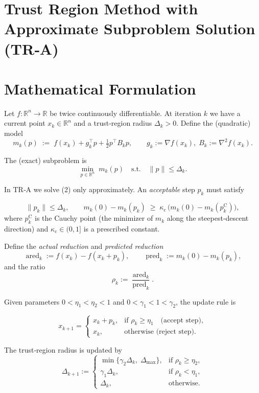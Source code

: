\documentclass[11pt]{article}
\begin{document}
\section*{Trust Region Method with Approximate Subproblem Solution (TR‑A)}

\section*{Mathematical Formulation}
Let $f:\mathbb{R}^{n}\rightarrow\mathbb{R}$ be twice continuously differentiable.  
At iteration $k$ we have a current point $x_{k}\in\mathbb{R}^{n}$ and a trust‑region radius $\Delta_{k}>0$.  
Define the (quadratic) model
\[
m_{k}(p)\;:=\;f(x_{k})+g_{k}^{\top}p+\tfrac12 p^{\top}B_{k}p,
\qquad 
g_{k}:=\nabla f(x_{k}),\; B_{k}:=\nabla^{2}f(x_{k}).
\tag{1}
\]

The (exact) subproblem is
\[
\min_{p\in\mathbb{R}^{n}}\; m_{k}(p)\quad\text{s.t.}\quad \|p\|\le \Delta_{k}.
\tag{2}
\]

In TR‑A we solve (2) only approximately.  An \emph{acceptable} step $p_{k}$ must satisfy

\[
\|p_{k}\|\le\Delta_{k},
\qquad
m_{k}(0)-m_{k}(p_{k})\;\ge\; \kappa_{\mathrm{c}}\,\bigl(m_{k}(0)-m_{k}(p^{\mathrm{C}}_{k})\bigr),
\tag{3}
\]
where $p^{\mathrm{C}}_{k}$ is the Cauchy point (the minimizer of $m_{k}$ along the steepest‑descent direction) and
$\kappa_{\mathrm{c}}\in(0,1]$ is a prescribed constant.

Define the \emph{actual reduction} and \emph{predicted reduction}
\[
\operatorname{ared}_{k}
:=f(x_{k})-f(x_{k}+p_{k}),\qquad
\operatorname{pred}_{k}
:=m_{k}(0)-m_{k}(p_{k}),
\tag{4}
\]
and the ratio
\[
\rho_{k}:=\frac{\operatorname{ared}_{k}}{\operatorname{pred}_{k}}.
\tag{5}
\]

Given parameters $0<\eta_{1}<\eta_{2}<1$ and $0<\gamma_{1}<1<\gamma_{2}$, the update rule is

\[
x_{k+1}=
\begin{cases}
x_{k}+p_{k}, & \text{if }\rho_{k}\ge \eta_{1}\quad\text{(accept step)},\\[4pt]
x_{k},       & \text{otherwise (reject step)}.
\end{cases}
\tag{6}
\]

The trust‑region radius is updated by
\[
\Delta_{k+1}:=
\begin{cases}
\min\{\gamma_{2}\Delta_{k},\;\Delta_{\max}\}, & \text{if }\rho_{k}\ge \eta_{2},\\[4pt]
\gamma_{1}\Delta_{k},                         & \text{if }\rho_{k}<\eta_{1},\\[4pt]
\Delta_{k},                                    & \text{otherwise}.
\end{cases}
\tag{7}
\]
\end{document}
